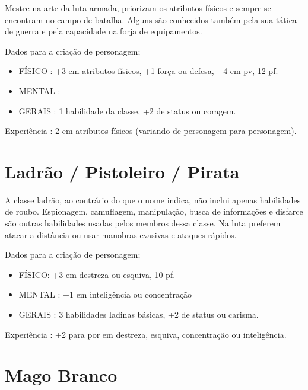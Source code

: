 Mestre na arte da luta armada, priorizam os atributos físicos e sempre se encontram no campo de batalha. Alguns são conhecidos também pela sua tática de guerra e pela capacidade na forja de equipamentos. 

Dados para a criação de personagem;

\begin{itemize}


	\item FÍSICO : +3 em atributos físicos, +1 força ou defesa, +4 em pv, 12 pf.

	\item MENTAL : -

	\item GERAIS : 1 habilidade da classe, +2 de status ou coragem.

\end{itemize}

Experiência : 2 em atributos físicos (variando de personagem para personagem).

\section{Ladrão / Pistoleiro / Pirata}

A classe ladrão, ao contrário do que o nome indica, não inclui apenas habilidades de roubo. Espionagem, camuflagem, manipulação, busca de informações e disfarce são outras habilidades usadas pelos membros dessa classe. Na luta preferem atacar a distância ou usar manobras evasivas e ataques rápidos.

Dados para a criação de personagem;

\begin{itemize}


	\item FÍSICO:  +3 em destreza ou esquiva, 10 pf.  

	\item MENTAL : +1 em inteligência ou concentração 

	\item GERAIS : 3 habilidades ladinas básicas, +2 de status ou carisma.

\end{itemize}

Experiência : +2 para por em destreza, esquiva, concentração ou inteligência.

\section{Mago Branco}

